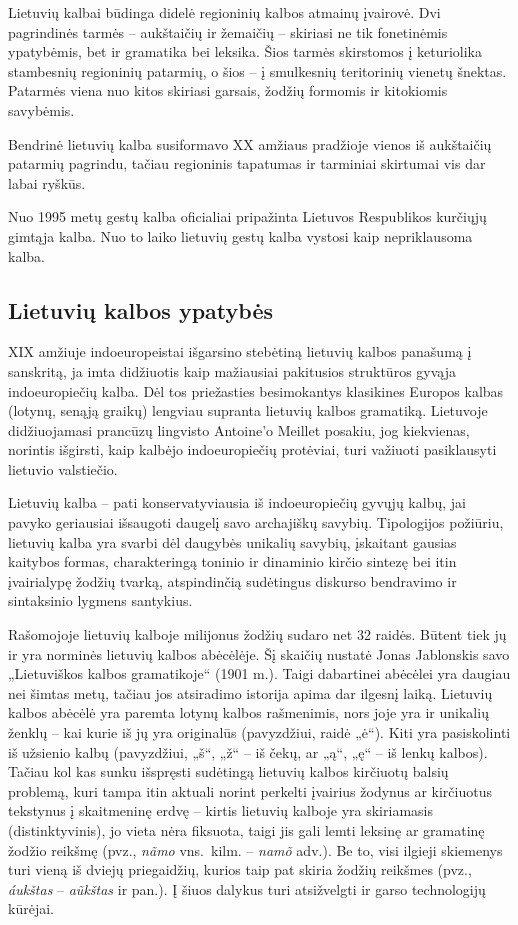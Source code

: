 \begin{multicols}{2}
Lietuvių kalbai būdinga didelė regioninių kalbos atmainų įvairovė. Dvi pagrindinės tarmės – aukštaičių ir žemaičių – skiriasi ne tik fonetinėmis ypatybėmis, bet ir gramatika bei leksika. Šios tarmės skirstomos į keturiolika stambesnių regioninių patarmių, o šios – į smulkesnių teritorinių vienetų šnektas. Patarmės viena nuo kitos skiriasi garsais, žodžių formomis ir kitokiomis savybėmis.

Bendrinė lietuvių kalba susiformavo XX amžiaus pradžioje vienos iš aukštaičių patarmių pagrindu, tačiau regioninis tapatumas ir tarminiai skirtumai vis dar labai ryškūs.

Nuo 1995 metų gestų kalba oficialiai pripažinta Lietuvos Respublikos kurčiųjų gimtąja kalba. Nuo to laiko lietuvių gestų kalba vystosi kaip nepriklausoma kalba.

\subsection{Lietuvių kalbos ypatybės}

 XIX amžiuje indoeuropeistai išgarsino stebėtiną lietuvių kalbos panašumą į sanskritą, ja imta didžiuotis kaip mažiausiai pakitusios struktūros gyvąja indoeuropiečių kalba. Dėl tos priežasties besimokantys klasikines Europos kalbas (lotynų, senąją graikų) lengviau supranta lietuvių kalbos gramatiką. Lietuvoje didžiuojamasi prancūzų lingvisto Antoine’o Meillet posakiu, jog kiekvienas, norintis išgirsti, kaip kalbėjo indoeuropiečių protėviai, turi važiuoti pasiklausyti lietuvio valstiečio.

Lietuvių kalba – pati konservatyviausia iš indoeuropiečių gyvųjų kalbų, jai pavyko geriausiai išsaugoti daugelį savo archajiškų savybių. Tipologijos požiūriu, lietuvių kalba yra svarbi dėl daugybės unikalių savybių, įskaitant gausias kaitybos formas, charakteringą toninio ir dinaminio kirčio sintezę bei itin įvairialypę žodžių tvarką, atspindinčią sudėtingus diskurso bendravimo ir sintaksinio lygmens santykius.

Rašomojoje lietuvių kalboje milijonus žodžių sudaro net 32 raidės. Būtent tiek jų ir yra norminės lietuvių kalbos abėcėlėje. Šį skaičių nustatė Jonas Jablonskis savo „Lietuviškos kalbos gramatikoje“ (1901 m.). Taigi dabartinei abėcėlei yra daugiau nei šimtas metų, tačiau jos atsiradimo istorija apima dar ilgesnį laiką. Lietuvių kalbos abėcėlė yra paremta lotynų kalbos rašmenimis, nors joje yra ir unikalių ženklų – kai kurie iš jų yra originalūs (pavyzdžiui, raidė „ė“). Kiti yra pasiskolinti iš užsienio kalbų (pavyzdžiui, „š“, „ž“ – iš čekų,  ar „ą“, „ę“ – iš lenkų kalbos). Tačiau kol kas sunku išspręsti sudėtingą lietuvių kalbos kirčiuotų balsių problemą, kuri tampa itin aktuali norint perkelti įvairius žodynus ar kirčiuotus tekstynus į skaitmeninę erdvę – kirtis lietuvių kalboje yra skiriamasis (distinktyvinis), jo vieta nėra fiksuota, taigi jis gali lemti leksinę ar gramatinę žodžio reikšmę (pvz., \textit{nãmo} vns.~kilm. – \textit{namõ} adv.). Be to, visi ilgieji skiemenys turi vieną iš dviejų priegaidžių, kurios taip pat skiria žodžių reikšmes (pvz., \textit{áukštas} – \textit{aũkštas}  ir pan.).
Į šiuos dalykus turi atsižvelgti ir garso technologijų kūrėjai.
    

\end{multicols}

